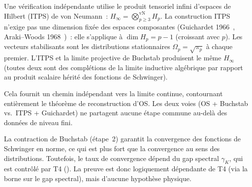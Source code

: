 \documentclass[12pt,a4paper]{article}
\begin{document}
\begin{remarque}
\label{rem:ITPS}
Une vérification indépendante utilise le produit tensoriel infini
d'espaces de Hilbert (ITPS) de von Neumann~:
$H_\infty = \bigotimes_{p \geq 3}^{\mathrm{vN}} H_p$. La
construction ITPS n'exige pas une dimension fixée des espaces
composantes (Guichardet 1966~\cite{Guichardet1966},
Araki--Woods 1968~\cite{ArakiWoods1968})~: elle s'applique à
$\dim H_p = p - 1$ (croissant avec $p$). Les vecteurs
stabilisants sont les distributions stationnaires
$\Omega_p = \sqrt{\pi_p}$ à chaque premier. L'ITPS et la limite
projective de Buchstab produisent le même $H_\infty$ (toutes deux
sont des complétions de la limite inductive algébrique par
rapport au produit scalaire hérité des fonctions de Schwinger).

Cela fournit un chemin indépendant vers la limite continue,
contournant entièrement le théorème de reconstruction d'OS. Les
deux voies (OS + Buchstab vs.\ ITPS + Guichardet) ne partagent
aucune étape commune au-delà des données de niveau fini.
\end{remarque}

\begin{remarque}
\label{rem:os_subtlety}
La contraction de Buchstab (étape~2) garantit la convergence des
fonctions de Schwinger en norme, ce qui est plus fort que la
convergence au sens des distributions. Toutefois, le taux de
convergence dépend du gap spectral $\gamma_K$, qui est contrôlé
par T4 (\cite{companion_M3}). La preuve est donc logiquement
dépendante de T4 (via la borne sur le gap spectral), mais d'aucune
hypothèse physique.
\end{remarque}



\end{document}
